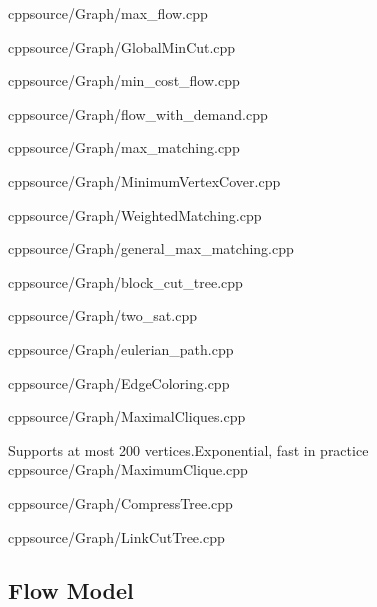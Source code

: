 \documentclass[portrait, 8pt, a4paper, oneside, twocolumn]{extarticle}
\begin{document}
{cpp}{source/Graph/max_flow.cpp}

{cpp}{source/Graph/GlobalMinCut.cpp}


{cpp}{source/Graph/min_cost_flow.cpp}

{cpp}{source/Graph/flow_with_demand.cpp}

{cpp}{source/Graph/max_matching.cpp}

{cpp}{source/Graph/MinimumVertexCover.cpp}

{cpp}{source/Graph/WeightedMatching.cpp}

{cpp}{source/Graph/general_max_matching.cpp}

{cpp}{source/Graph/block_cut_tree.cpp}

{cpp}{source/Graph/two_sat.cpp}

{cpp}{source/Graph/eulerian_path.cpp}

{cpp}{source/Graph/EdgeColoring.cpp}

{cpp}{source/Graph/MaximalCliques.cpp}

{Supports at most 200 vertices.}{Exponential, fast in practice}
{cpp}{source/Graph/MaximumClique.cpp}

{cpp}{source/Graph/CompressTree.cpp}

{cpp}{source/Graph/LinkCutTree.cpp}



\subsection{Flow Model}

\end{document}
